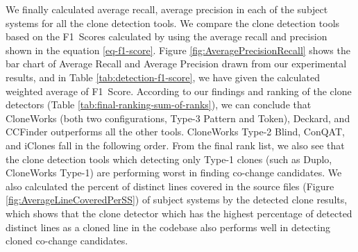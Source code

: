 \documentclass[review]{elsarticle}
\begin{document}
We finally calculated average recall, average precision in each of the subject systems for all the clone detection tools. We compare the clone detection tools based on the F1~Scores calculated by using the average recall and precision shown in the equation \ref{eq-f1-score}. Figure \ref{fig:AveragePrecisionRecall} shows the bar chart of Average Recall and Average Precision drawn from our experimental results, and in Table \ref{tab:detection-f1-score}, we have given the calculated weighted average of F1~Score. According to our findings and ranking of the clone detectors (Table \ref{tab:final-ranking-sum-of-ranks}), we can conclude that CloneWorks (both two configurations, Type-3 Pattern and Token), Deckard, and CCFinder outperforms all the other tools. CloneWorks Type-2 Blind, ConQAT, and iClones fall in the following order. From the final rank list, we also see that the clone detection tools which detecting only Type-1 clones (such as Duplo, CloneWorks Type-1) are performing worst in finding co-change candidates.  We also calculated the percent of distinct lines covered in the source files (Figure \ref{fig:AverageLineCoveredPerSS}) of subject systems by the detected clone results, which shows that the clone detector which has the highest percentage of detected distinct lines as a cloned line in the codebase also performs well in detecting cloned co-change candidates.

\end{document}
